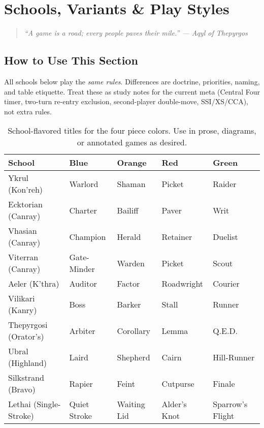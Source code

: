 \documentclass[11pt]{article}
\renewcommand{\arraystretch}{1.15}
\begin{document}
\clearpage

\section{Schools, Variants \& Play Styles}\label{sec:variants}
\begin{quote}\small\itshape
“A game is a road; every people paves their mile.” — Aqyl of Thepyrgos
\end{quote}

\subsection*{How to Use This Section}
All schools below play the \emph{same rules}. Differences are doctrine, priorities, naming, and table etiquette. Treat these as study notes for the current meta (Central Four timer, two-turn re-entry exclusion, second-player double-move, SSI/XS/CCA), not extra rules.


\begin{table}[h]
\centering
\small
\setlength{\tabcolsep}{6pt}
\renewcommand{\arraystretch}{1.15}
\begin{tabular}{@{}lllll@{}}
\toprule
\textbf{School} & \textbf{Blue} & \textbf{Orange} & \textbf{Red} & \textbf{Green}\\
\midrule
Ykrul (Kon'reh)      & Warlord        & Shaman        & Picket      & Raider\\
Ecktorian (Canray)   & Charter        & Bailiff       & Paver       & Writ\\
Vhasian (Canray)     & Champion       & Herald        & Retainer    & Duelist\\
Viterran (Canray)    & Gate-Minder    & Warden        & Picket      & Scout\\
Aeler (K’thra)       & Auditor        & Factor        & Roadwright    & Courier\\
Vilikari (Kanry)     & Boss      & Barker        & Stall     & Runner\\
Thepyrgosi (Orator’s)& Arbiter        & Corollary     & Lemma       & Q.E.D.\\
Ubral (Highland)     & Laird          & Shepherd      & Cairn       & Hill-Runner\\
Silkstrand (Bravo)   & Rapier         & Feint         & Cutpurse    & Finale\\
Lethai (Single-Stroke) & Quiet Stroke & Waiting Lid & Alder’s Knot & Sparrow’s Flight\\
\bottomrule
\end{tabular}
\caption{School-flavored titles for the four piece colors. Use in prose, diagrams, or annotated games as desired.}
\end{table}
\end{document}

